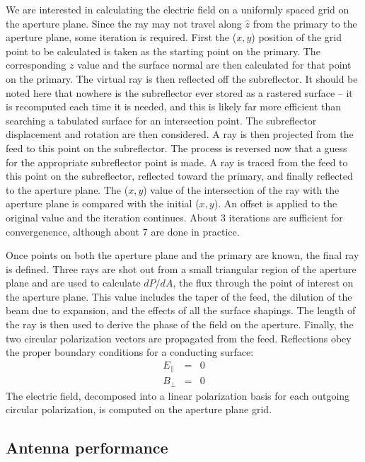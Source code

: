 \documentclass{article}
\begin{document}
We are interested in calculating the electric field on a uniformly spaced grid
on the aperture plane.  Since the ray may not travel along $\hat{z}$ from the
primary to the aperture plane, some iteration is required.  First the
($x, y$) position of the grid point to be calculated is taken as the starting
point on the primary.  The corresponding $z$ value and the surface normal are
then calculated for that point on the primary.  The virtual ray is then 
reflected off the subreflector.  
It should be noted here that nowhere is the subreflector ever stored as a
rastered surface -- it is recomputed each time it is needed, and this is likely
far more efficient than searching a tabulated surface for an intersection
point.  The subreflector displacement and rotation
are then considered.  A ray is then projected from the feed to this point on
the subreflector.  The process is reversed now that a guess for the 
appropriate subreflector point is made.  A ray is traced from the feed to
this point on the subreflector, reflected toward the primary, and finally
reflected to the aperture plane.  The ($x, y$) value of the intersection
of the ray with the aperture plane is compared with the initial ($x, y$).
An offset is applied to the original value and the iteration continues.  About
3 iterations are sufficient for convergenence, although about 7 are done
in practice.

Once points on both the aperture plane and the primary are known, the final
ray is defined.  Three rays are shot out from a small triangular region of the 
aperture plane and are used to calculate $dP/dA$, the flux through the 
point of interest on the aperture plane.  This value includes the taper of
the feed, the dilution of the beam due to expansion, and the effects of all
the surface shapings.  The length of the ray is then used to derive the
phase of the field on the aperture.  Finally, the two circular polarization
vectors are propagated from the feed.  Reflections obey the proper boundary 
conditions for a conducting surface:
\begin{eqnarray}
E_{\parallel} & = & 0 \\
B_{\perp} & = & 0 
\end{eqnarray}
The electric field, decomposed into a linear polarization basis for each
outgoing circular polarization, is computed on the aperture plane grid.

\subsection{Antenna performance} \label{sec:perf}
\end{document}
